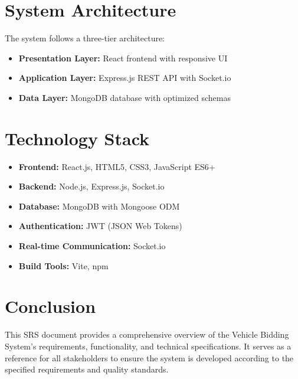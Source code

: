 \documentclass[12pt,a4paper]{report}
\begin{document}
\chapter{System Architecture}
The system follows a three-tier architecture:
\begin{itemize}
    \item \textbf{Presentation Layer:} React frontend with responsive UI
    \item \textbf{Application Layer:} Express.js REST API with Socket.io
    \item \textbf{Data Layer:} MongoDB database with optimized schemas
\end{itemize}

\chapter{Technology Stack}
\begin{itemize}
    \item \textbf{Frontend:} React.js, HTML5, CSS3, JavaScript ES6+
    \item \textbf{Backend:} Node.js, Express.js, Socket.io
    \item \textbf{Database:} MongoDB with Mongoose ODM
    \item \textbf{Authentication:} JWT (JSON Web Tokens)
    \item \textbf{Real-time Communication:} Socket.io
    \item \textbf{Build Tools:} Vite, npm
\end{itemize}

\chapter{Conclusion}
This SRS document provides a comprehensive overview of the Vehicle Bidding System's requirements, functionality, and technical specifications. It serves as a reference for all stakeholders to ensure the system is developed according to the specified requirements and quality standards.
\end{document}

